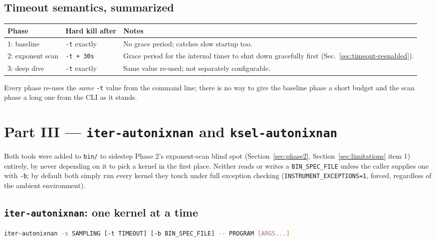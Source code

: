 \documentclass[11pt]{article}
\begin{document}
\subsection{Timeout semantics, summarized}

\begin{center}
\begin{tabular}{lll}
\toprule
Phase & Hard kill after & Notes \\
\midrule
1: baseline & \texttt{-t} exactly & No grace period; catches slow startup too. \\
2: exponent scan & \texttt{-t + 30s} & Grace period for the internal timer to shut down gracefully first (Sec.~\ref{sec:timeout-reenabled}). \\
3: deep dive & \texttt{-t} exactly & Same value re-used; not separately configurable. \\
\bottomrule
\end{tabular}
\end{center}

Every phase re-uses the \emph{same} \texttt{-t} value from the command
line; there is no way to give the baseline phase a short budget and the
scan phase a long one from the CLI as it stands.

\section{Part III --- \texttt{iter-autonixnan} and \texttt{ksel-autonixnan}}
\label{sec:iter-ksel}

Both tools were added to \texttt{bin/} to sidestep Phase 2's
exponent-scan blind spot (Section~\ref{sec:phase2},
Section~\ref{sec:limitations} item 1) entirely, by never depending on it
to pick a kernel in the first place. Neither reads or writes a
\texttt{BIN\_SPEC\_FILE} unless the caller supplies one with \texttt{-b};
by default both simply run every kernel they touch under full exception
checking (\texttt{INSTRUMENT\_EXCEPTIONS=1}, forced, regardless of the
ambient environment).

\subsection{\texttt{iter-autonixnan}: one kernel at a time}

\begin{lstlisting}[language=bash]
iter-autonixnan -s SAMPLING [-t TIMEOUT] [-b BIN_SPEC_FILE] -- PROGRAM [ARGS...]
\end{lstlisting}
\end{document}
